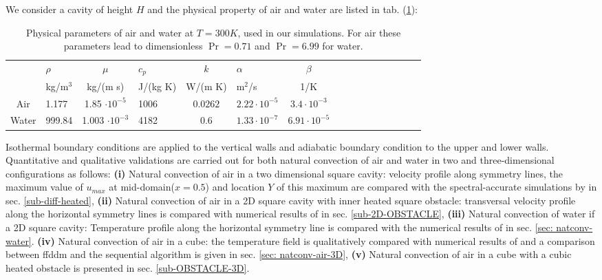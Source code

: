 We consider a cavity of height $H$ and the physical property of air and water are listed in tab. (\ref{tab-param-phys-air}):
\begin{table}[ht!]
   \begin{center}
      \begin{tabular}{*{8}{cl}}
         
        & $\rho$ &$ \mu$ & $c_p $ & $k$ & $\alpha $ & $\beta$ \\
        & kg/m$^3$& kg/(m s) & J/(kg K) & W/(m K) & m$^2$/s & 1/K \\
         \hline
        Air & 1.177 & 1.85 $\cdot 10^{-5}$  & 1006 & $0.0262$ & $2.22 \cdot 10^{-5}$ & $3.4 \cdot 10^{-3}$ \\
        Water & 999.84 & 1.003 $\cdot 10^{-3}$  & 4182 & $0.6$ & $1.33 \cdot 10^{-7}$ & $6.91 \cdot 10^{-5}$
      \end{tabular}
   \end{center}
   \caption{Physical parameters of air and water at $T = 300K$, used in our simulations. For air these parameters lead to dimensionless $\Pr = 0.71$ and $\Pr = 6.99$ for water.}
   \label{tab-param-phys-air}
\end{table}

Isothermal boundary conditions are applied to the vertical walls and adiabatic boundary condition to the upper and lower walls.
Quantitative and qualitative validations are carried out for both natural convection of air and water in two and three-dimensional configurations as follows: \newline{}
{\bf(i)} Natural convection of air in a two dimensional square cavity: velocity profile along symmetry lines, the maximum value of $u_{max}$ at mid-domain($x=0.5$) and location $Y$ of this maximum  are compared with the spectral-accurate simulations by \cite{LeQuere91} in sec. \ref{sub-diff-heated}, \newline{}
{\bf(ii)} Natural convection of air in a 2D square cavity with inner heated square obstacle: transversal velocity profile along the  horizontal symmetry lines is compared with numerical results of \cite{Raluca2013} 
in sec. \ref{sub-2D-OBSTACLE}, \newline{}
{\bf(iii)} Natural convection of water if a 2D square cavity: Temperature profile along the horizontal symmetry line is compared with the numerical results of \cite{Kowalewski-2003} in sec. \ref{sec: natconv-water}.
{\bf(iv)} Natural convection of air in a cube: the temperature field is qualitatively compared with numerical results of \cite{Wakashima-2004} and a comparison between ffddm and the sequential algorithm is given in 
sec. \ref{sec: natconv-air-3D}, \newline{}
{\bf(v)} Natural convection of air in a cube with a cubic heated obstacle is presented in sec. \ref{sub-OBSTACLE-3D}.

